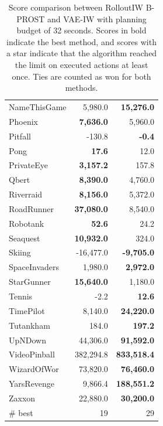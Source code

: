 \begin{table}[ht]
\begin{center}
\begin{small}
\begin{tabular}{lrr}
NameThisGame   & 5,980.0            & \textbf{15,276.0}  \\
Phoenix        & \textbf{7,636.0}   & 5,960.0            \\
Pitfall        & -130.8             & \textbf{-0.4}      \\
Pong           & \textbf{17.6}      & 12.0               \\
PrivateEye     & \textbf{3,157.2}   & 157.8              \\
Qbert          & \textbf{8,390.0}   & 4,760.0            \\
Riverraid      & \textbf{8,156.0}   & 5,372.0            \\
RoadRunner     & \textbf{37,080.0}  & 8,540.0            \\
Robotank       & \textbf{52.6}      & 24.2               \\
Seaquest       & \textbf{10,932.0}  & 324.0              \\
Skiing         & -16,477.0          & \textbf{-9,705.0}  \\
SpaceInvaders  & 1,980.0            & \textbf{2,972.0}   \\
StarGunner     & \textbf{15,640.0}  & 1,180.0            \\
Tennis         & -2.2               & \textbf{12.6}      \\
TimePilot      & 8,140.0            & \textbf{24,220.0}  \\
Tutankham      & 184.0              & \textbf{197.2}     \\
UpNDown        & 44,306.0           & \textbf{91,592.0}  \\
VideoPinball   & 382,294.8          & \textbf{833,518.4} \\
WizardOfWor    & 73,820.0           & \textbf{76,460.0}  \\
YarsRevenge    & 9,866.4            & \textbf{188,551.2} \\
Zaxxon         & 22,880.0           & \textbf{30,200.0} \\

\midrule
\# best & 19 & 29 \\
\bottomrule

\end{tabular}
\caption{Score comparison between RolloutIW B-PROST and VAE-IW with planning budget of 32 seconds. Scores in bold indicate the best method, and scores with a star indicate that the algorithm reached the limit on executed actions at least once. Ties are counted as won for both methods.}
\label{tab:higher_time_budget_bprost}

\end{small}
\end{center}
\end{table}